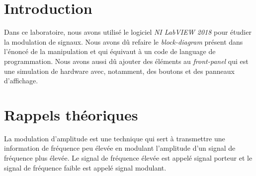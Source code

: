 \documentclass[a4paper]{article}
\begin{document}
\let\cleardoublepage\clearpage















\section{Introduction}





Dans ce laboratoire, nous avons utilisé le logiciel \textit{NI LabVIEW 2018} pour étudier la modulation de signaux. Nous avons dû refaire le \textit{block-diagram} présent dans l'énoncé de la manipulation et qui équivaut à un code de language de programmation. Nous avons aussi dû ajouter des éléments au \textit{front-panel} qui est une simulation de hardware avec, notamment, des boutons et des panneaux d'affichage.















\section{Rappels théoriques}





La modulation d'amplitude est une technique qui sert à transmettre une information de fréquence peu élevée en modulant l'amplitude d'un signal de fréquence plus élevée. Le signal de fréquence élevée est appelé signal porteur et le signal de fréquence faible est appelé signal modulant.
\end{document}
